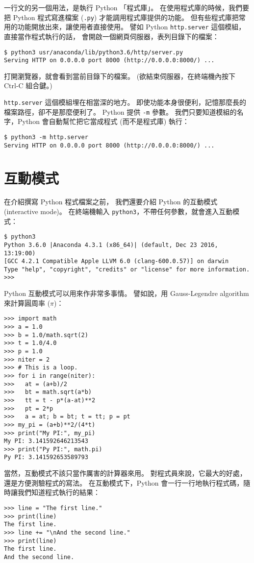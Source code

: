 \documentclass[a4paper,12pt]{book}
\theoremstyle{definition}
\begin{document}
一行文的另一個用法，是執行 Python 「程式庫」。
在使用程式庫的時候，我們要把 Python 程式寫進檔案 (\verb+.py+)
才能調用程式庫提供的功能。
但有些程式庫把常用的功能開放出來，讓使用者直接使用。
譬如 Python \verb+http.server+ 這個模組，直接當作程式執行的話，
會開啟一個網頁伺服器，表列目錄下的檔案：
%
\begin{verbatim}
$ python3 usr/anaconda/lib/python3.6/http/server.py
Serving HTTP on 0.0.0.0 port 8000 (http://0.0.0.0:8000/) ...
\end{verbatim}
%
打開瀏覽器，就會看到當前目錄下的檔案。
(欲結束伺服器，在終端機內按下 Ctrl-C 組合鍵。)

\verb+http.server+ 這個模組埋在相當深的地方。
即使功能本身很便利，記憶那麼長的檔案路徑，卻不是那麼便利了。
Python 提供 \verb+-m+ 參數。
我們只要知道模組的名字，Python 會自動幫忙把它當成程式 (而不是程式庫) 執行：
%
\begin{verbatim}
$ python3 -m http.server
Serving HTTP on 0.0.0.0 port 8000 (http://0.0.0.0:8000/) ...
\end{verbatim}

\section{互動模式}
%
\label{c:runtime:interactive}

在介紹撰寫 Python 程式檔案之前，
我們還要介紹 Python 的互動模式 (interactive mode)。
在終端機輸入 \verb+python3+，不帶任何參數，就會進入互動模式：
%
\begin{verbatim}
$ python3
Python 3.6.0 |Anaconda 4.3.1 (x86_64)| (default, Dec 23 2016, 13:19:00)
[GCC 4.2.1 Compatible Apple LLVM 6.0 (clang-600.0.57)] on darwin
Type "help", "copyright", "credits" or "license" for more information.
>>>
\end{verbatim}

Python 互動模式可以用來作非常多事情。
譬如說，用 Gauss-Legendre algorithm 來計算圓周率 ($\pi$)：
%
\begin{verbatim}
>>> import math
>>> a = 1.0
>>> b = 1.0/math.sqrt(2)
>>> t = 1.0/4.0
>>> p = 1.0
>>> niter = 2
>>> # This is a loop.
>>> for i in range(niter):
>>>   at = (a+b)/2
>>>   bt = math.sqrt(a*b)
>>>   tt = t - p*(a-at)**2
>>>   pt = 2*p
>>>   a = at; b = bt; t = tt; p = pt
>>> my_pi = (a+b)**2/(4*t)
>>> print("My PI:", my_pi)
My PI: 3.141592646213543
>>> print("Py PI:", math.pi)
Py PI: 3.141592653589793
\end{verbatim}
%
當然，互動模式不該只當作厲害的計算器來用。
對程式員來說，它最大的好處，還是方便測驗程式的寫法。
在互動模式下，Python 會一行一行地執行程式碼，隨時讓我們知道程式執行的結果：
%
\begin{verbatim}
>>> line = "The first line."
>>> print(line)
The first line.
>>> line += "\nAnd the second line."
>>> print(line)
The first line.
And the second line.
\end{verbatim}
\end{document}
